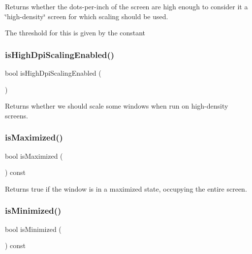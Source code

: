 Returns whether the dots-\/per-\/inch of the screen are high enough to consider it a \char`\"{}high-\/density\char`\"{} screen for which scaling should be used. 

The threshold for this is given by the constant \mbox{\label{classGWindow_a040690336154a3f414001a16ffdb947e}} 
\subsubsection{\texorpdfstring{is\+High\+Dpi\+Scaling\+Enabled()}{isHighDpiScalingEnabled()}}
{\footnotesize\ttfamily bool is\+High\+Dpi\+Scaling\+Enabled (\begin{DoxyParamCaption}{ }\end{DoxyParamCaption})\hspace{0.3cm}{\ttfamily [static]}}



Returns whether we should scale some windows when run on high-\/density screens. 

\mbox{\label{classGWindow_a28e910de88f3ff5419710b0b0a03c2bb}} 
\subsubsection{\texorpdfstring{is\+Maximized()}{isMaximized()}}
{\footnotesize\ttfamily bool is\+Maximized (\begin{DoxyParamCaption}{ }\end{DoxyParamCaption}) const\hspace{0.3cm}{\ttfamily [virtual]}}



Returns true if the window is in a maximized state, occupying the entire screen. 

\mbox{\label{classGWindow_a14e6f95fa2c9ec543caa7f16f30c53d6}} 
\subsubsection{\texorpdfstring{is\+Minimized()}{isMinimized()}}
{\footnotesize\ttfamily bool is\+Minimized (\begin{DoxyParamCaption}{ }\end{DoxyParamCaption}) const\hspace{0.3cm}{\ttfamily [virtual]}}



